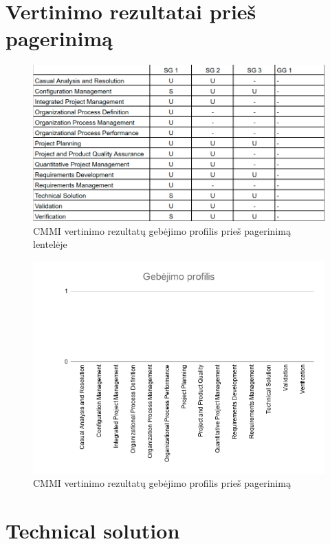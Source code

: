 \documentclass{VUMIFPSkursinis}
\begin{document}
	\section{Vertinimo rezultatai prieš pagerinimą}
	\begin{figure}[!htbp]
		\includegraphics[scale=0.55]{img/profilisPriesLentele}
		\caption{CMMI vertinimo rezultatų gebėjimo profilis prieš pagerinimą lentelėje} %
		\label{img:ProfilisPries}
	\end{figure}
	\begin{figure}[!htbp]
		\includegraphics[scale=0.8]{img/ProfilisPries}
		\caption{CMMI vertinimo rezultatų gebėjimo profilis prieš pagerinimą} %
		\label{img:ProfilisPries}
	\end{figure}
	\section{Technical solution}
\end{document}
